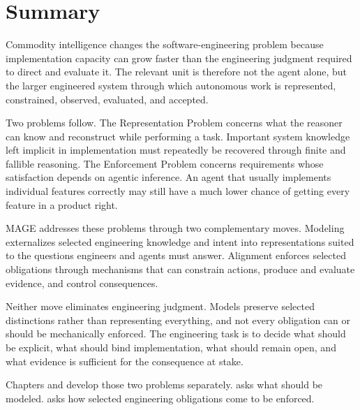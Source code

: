 




\chapter{Summary}

Commodity intelligence changes the software-engineering problem because implementation capacity can grow faster than the engineering judgment required to direct and evaluate it. The relevant unit is therefore not the agent alone, but the larger engineered system through which autonomous work is represented, constrained, observed, evaluated, and accepted.

Two problems follow. The Representation Problem concerns what the reasoner can know and reconstruct while performing a task. Important system knowledge left implicit in implementation must repeatedly be recovered through finite and fallible reasoning. The Enforcement Problem concerns requirements whose satisfaction depends on agentic inference. An agent that usually implements individual features correctly may still have a much lower chance of getting every feature in a product right.

MAGE addresses these problems through two complementary moves. Modeling externalizes selected engineering knowledge and intent into representations suited to the questions engineers and agents must answer. Alignment enforces selected obligations through mechanisms that can constrain actions, produce and evaluate evidence, and control consequences.

Neither move eliminates engineering judgment. Models preserve selected distinctions rather than representing everything, and not every obligation can or should be mechanically enforced. The engineering task is to decide what should be explicit, what should bind implementation, what should remain open, and what evidence is sufficient for the consequence at stake.

Chapters  and  develop those two problems separately.  asks what should be modeled.  asks how selected engineering obligations come to be enforced.
